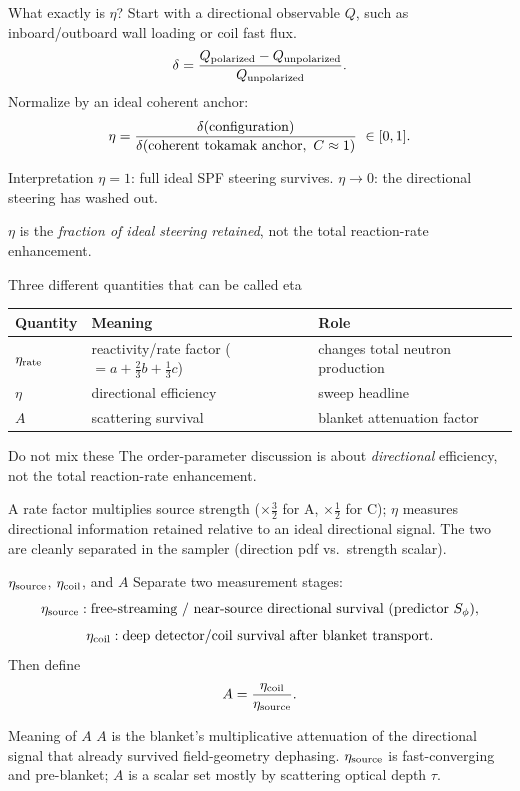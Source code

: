 \documentclass[aspectratio=169]{beamer}
\newcommand{\Sphi}{S_\phi}
\begin{document}
\begin{frame}[t]{What exactly is $\eta$?}
Start with a directional observable $Q$, such as inboard/outboard wall loading or coil fast flux.
\[
\delta = \frac{Q_{\rm polarized}-Q_{\rm unpolarized}}{Q_{\rm unpolarized}}.
\]
Normalize by an ideal coherent anchor:
\[
\eta = \frac{\delta({\rm configuration})}
{\delta({\rm coherent\ tokamak\ anchor},\ C\approx 1)}
\ \in[0,1].
\]
\begin{block}{Interpretation}
$\eta=1$: full ideal SPF steering survives.\newline
$\eta\rightarrow 0$: the directional steering has washed out.
\end{block}
$\eta$ is the \emph{fraction of ideal steering retained}, not the total reaction-rate enhancement.
\end{frame}

\begin{frame}[t]{Three different quantities that can be called eta}
\begin{tabular}{lll}
\toprule
Quantity & Meaning & Role \\
\midrule
$\eta_{\rm rate}$ & reactivity/rate factor ($=a+\tfrac23 b+\tfrac13 c$) & changes total neutron production \\
$\eta$ & directional efficiency & sweep headline \\
$A$ & scattering survival & blanket attenuation factor \\
\bottomrule
\end{tabular}
\vspace{0.8em}
\begin{block}{Do not mix these}
The order-parameter discussion is about \emph{directional} efficiency, not the total reaction-rate enhancement.
\end{block}
A rate factor multiplies source strength ($\times\tfrac32$ for A, $\times\tfrac12$ for C); $\eta$ measures directional information retained relative to an ideal directional signal. The two are cleanly separated in the sampler (direction pdf vs.\ strength scalar).
\end{frame}

\begin{frame}[t]{$\eta_{\rm source}$, $\eta_{\rm coil}$, and $A$}
Separate two measurement stages:
\[
\eta_{\rm source}: \text{free-streaming / near-source directional survival (predictor }\Sphi\text{)},
\]
\[
\eta_{\rm coil}: \text{deep detector/coil survival after blanket transport}.
\]
Then define
\[
A = \frac{\eta_{\rm coil}}{\eta_{\rm source}}.
\]
\begin{block}{Meaning of $A$}
$A$ is the blanket's multiplicative attenuation of the directional signal that already survived field-geometry dephasing. $\eta_{\rm source}$ is fast-converging and pre-blanket; $A$ is a scalar set mostly by scattering optical depth $\tau$.
\end{block}
\end{frame}
\end{document}
